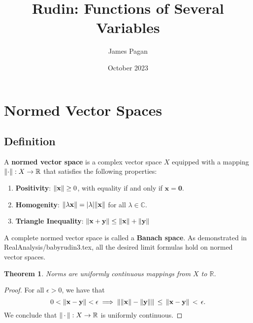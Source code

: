 \documentclass[11pt]{article}
\title{Rudin: Functions of Several Variables}
\author{James Pagan}
\date{October 2023}
\renewcommand{\vec}[1]{\mathbf{#1}}
\newtheorem{theorem}{Theorem}
\begin{document}
\maketitle
\tableofcontents
\newpage


\section{Normed Vector Spaces}


\subsection{Definition}

A \textbf{normed vector space} is a complex vector space $X$ equipped with a mapping $\norm{\cdot} : X \to \mathbb{R}$ that satisfies the following properties:
\begin{enumerate}
	\item \textbf{Positivity}: $\norm{\vec{x}} \ge 0$, with equality if and only if $\vec{x} = \vec{0}$.
	\item \textbf{Homogenity}: $\norm{\lambda \vec{x}} = \abs{\lambda} \norm{\vec{x}}$ for all $\lambda \in \mathbb{C}$.
  \item \textbf{Triangle Inequality}: $\norm{\vec{x} + \vec{y}} \le \norm{\vec{x}} + \norm{\vec{y}}$
\end{enumerate}
A complete normed vector space is called a \textbf{Banach space}. As demonstrated in RealAnalysis/babyrudin3.tex, all the desired limit formulas hold on normed vector spaces.

\begin{theorem}
  Norms are uniformly continuous mappings from $X$ to $\mathbb{R}$.
\end{theorem}
\begin{adjustwidth}{0.5cm}{}
  \begin{proof}
    For all $\epsilon > 0$, we have that
    \[
      0 < \norm{\vec{x} - \vec{y}} < \epsilon \implies \norm{\norm{\vec{x}} - \norm{\vec{y}}} \, \le \, \norm{\vec{x} - \vec{y}} \, < \, \epsilon.
    \]
    We conclude that $\norm{\, \cdot \,} : X \to \mathbb{R}$ is uniformly continuous.
  \end{proof}
\end{adjustwidth}
\end{document}
